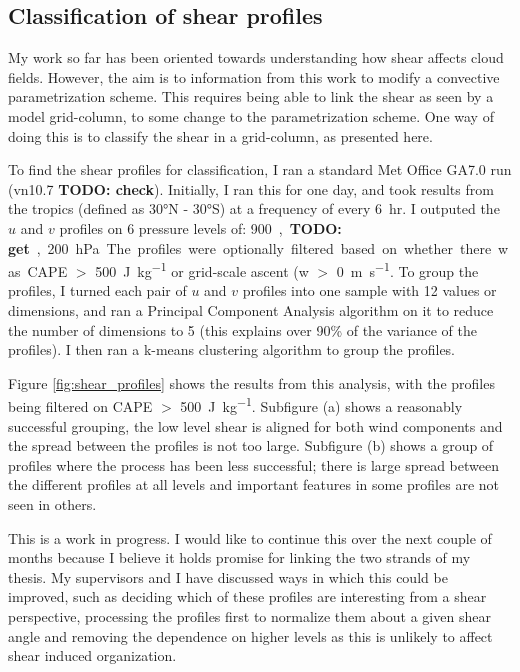 \documentclass[11pt,a4paper]{article}
\newcommand\todo[1]{\textbf{TODO: #1}}
\begin{document}
\subsection{Classification of shear profiles}
\label{sec:Classification of shear profiles}

My work so far has been oriented towards understanding how shear affects cloud fields. However, the aim is to information from this work to modify a convective parametrization scheme. This requires being able to link the shear as seen by a model grid-column, to some change to the parametrization scheme. One way of doing this is to classify the shear in a grid-column, as presented here.

To find the shear profiles for classification, I ran a standard Met Office GA7.0 run (vn10.7 \todo{check}). Initially, I ran this for one day, and took results from the tropics (defined as \ang{30}N - \ang{30}S) at a frequency of every \SI{6}{hr}. I outputed the $u$ and $v$ profiles on 6 pressure levels of: \SI{900}, \todo{get}, \SI{200}{hPa}. The profiles were optionally filtered based on whether there was CAPE $>$ \SI{500}{J.kg^{-1}} or grid-scale ascent (w $>$ \SI{0}{m.s^{-1}}. To group the profiles, I turned each pair of $u$ and $v$ profiles into one sample with 12 values or dimensions, and ran a Principal Component Analysis algorithm on it to reduce the number of dimensions to 5 (this explains over 90\% of the variance of the profiles). I then ran a k-means clustering algorithm to group the profiles.

Figure \ref{fig:shear_profiles} shows the results from this analysis, with the profiles being filtered on CAPE $>$ \SI{500}{J.kg^{-1}}. Subfigure (a) shows a reasonably successful grouping, the low level shear is aligned for both wind components and the spread between the profiles is not too large. Subfigure (b) shows a group of profiles where the process has been less successful; there is large spread between the different profiles at all levels and important features in some profiles are not seen in others.

This is a work in progress. I would like to continue this over the next couple of months because I believe it holds promise for linking the two strands of my thesis. My supervisors and I have discussed ways in which this could be improved, such as deciding which of these profiles are interesting from a shear perspective, processing the profiles first to normalize them about a given shear angle and removing the dependence on higher levels as this is unlikely to affect shear induced organization.
\end{document}
